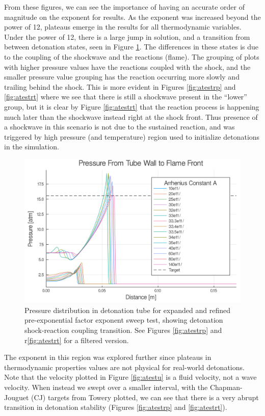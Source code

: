 From these figures, we can see the importance of having an accurate order of magnitude on the exponent for results. As the exponent was increased beyond the power of 12, plateaus emerge in the results for all thermodynamic variables. Under the power of 12, there is a large jump in solution, and a transition from between detonation states, seen in Figure \ref{fig:pjump}. The differences in these states is due to the coupling of the shockwave and the reactions (flame). The grouping of plots with higher pressure values have the reactions coupled with the shock, and the smaller pressure value grouping has the reaction occurring more slowly and trailing behind the shock. This is more evident in Figures \ref{fig:atestrp} and \ref{fig:atestrt} where we see that there is still a shockwave present in the ``lower'' group, but it is clear by Figure \ref{fig:atestrt} that the reaction process is happening much later than the shockwave instead right at the shock front. Thus presence of a shockwave in this scenario is not due to the sustained reaction, and was triggered by high pressure (and temperature) region used to initialize detonations in the simulation. 

\begin{figure}
\centering
\includegraphics[width=0.85\linewidth]{./figs/Atest_refined/p_large.png}
\caption{Pressure distribution in detonation tube for expanded and refined pre-exponential factor exponent sweep test, showing detonation shock-reaction coupling transition. See Figures \ref{fig:atestrp} and r\ref{fig:atestrt} for a filtered version.}
\label{fig:pjump}
\end{figure}


The exponent in this region was explored further since plateaus in thermodynamic properties values are not physical for real-world detonations. Note that the velocity plotted in Figure \ref{fig:atestu} is a fluid velocity, not a wave velocity. When instead we swept over a smaller interval, with the Chapman-Jouguet (CJ) targets from Towery\cite{towery1} plotted, we can see that there is a very abrupt transition in detonation stability (Figures \ref{fig:atestrp} and \ref{fig:atestrt}). 

